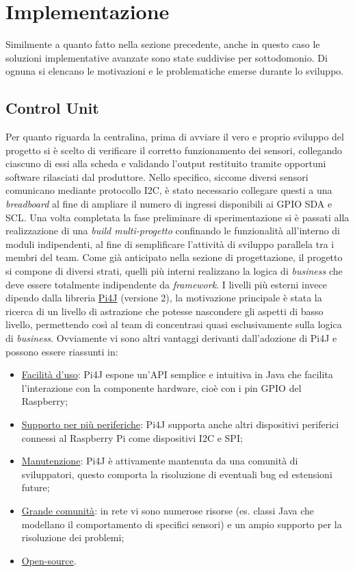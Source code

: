 
\section{Implementazione}\label{sec:implementazione}
Similmente a quanto fatto nella sezione precedente, anche in questo caso le soluzioni implementative avanzate sono state suddivise per sottodomonio. Di ognuna si elencano le motivazioni e le problematiche emerse durante lo sviluppo. 

\subsection{Control Unit}
Per quanto riguarda la centralina, prima di avviare il vero e proprio sviluppo del progetto si è scelto di verificare il corretto funzionamento dei sensori, collegando ciascuno di essi alla scheda e validando l'output restituito tramite opportuni software rilasciati dal produttore. Nello specifico, siccome diversi sensori comunicano mediante protocollo I2C, è stato necessario collegare questi a una \textit{breadboard} al fine di ampliare il numero di ingressi disponibili ai GPIO SDA e SCL. Una volta completata la fase preliminare di sperimentazione si è passati alla realizzazione di una \textit{build multi-progetto} confinando le funzionalità all'interno di moduli indipendenti, al fine di semplificare l'attività di sviluppo parallela tra i membri del team. Come già anticipato nella sezione di progettazione, il progetto si compone di diversi strati, quelli più interni realizzano la logica di \textit{business} che deve essere totalmente indipendente da \textit{framework}. I livelli più esterni invece dipendo dalla libreria \href{https://pi4j.com/}{Pi4J} (versione 2), la motivazione principale è stata la ricerca di un livello di astrazione che potesse nascondere gli aspetti di basso livello, permettendo così al team di concentrasi quasi esclusivamente sulla logica di \textit{business}. Ovviamente vi sono altri vantaggi derivanti dall'adozione di Pi4J e possono essere riassunti in:
\begin{itemize}
    \item \underline{Facilità d'uso}: Pi4J espone un'API semplice e intuitiva in Java che facilita l'interazione con la componente hardware, cioè con i pin GPIO del Raspberry;
    \item \underline{Supporto per più periferiche}: Pi4J supporta anche altri dispositivi periferici connessi al Raspberry Pi come dispositivi I2C e SPI;
    \item \underline{Manutenzione}: Pi4J è attivamente mantenuta da una comunità di sviluppatori, questo comporta la risoluzione di eventuali bug ed estensioni future;
    \item \underline{Grande comunità}: in rete vi sono numerose risorse (es. classi Java che modellano il comportamento di specifici sensori) e un ampio supporto per la risoluzione dei problemi;
    \item \underline{Open-source}.
\end{itemize}
